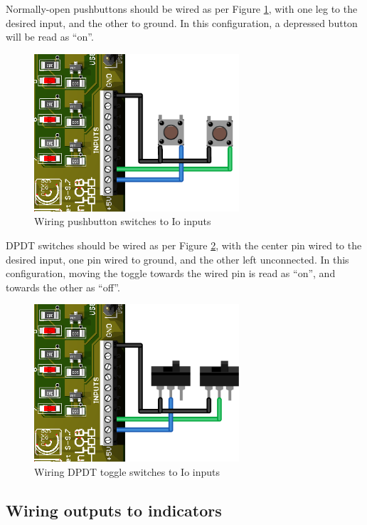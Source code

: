\documentclass[12pt]{book}
\begin{document}
Normally-open pushbuttons should be wired as per Figure \ref{pushbutton}, with one leg to the desired input, and the other to ground. In this configuration, a depressed button will be read as ``on''.

\begin{figure}[htbp]
\begin{center}
\includegraphics[width=3in]{images/Inputs-pushbutton.png}
\caption{Wiring pushbutton switches to Io inputs}
\label{pushbutton}
\end{center}
\end{figure}

DPDT switches should be wired as per Figure \ref{DPDT}, with the center pin wired to the desired input, one pin wired to ground, and the other left unconnected. In this configuration, moving the toggle towards the wired pin is read as ``on'', and towards the other as ``off''.

\begin{figure}[htbp]
\begin{center}
\includegraphics[width=3in]{images/Inputs-DPDT.png}
\caption{Wiring DPDT toggle switches to Io inputs}
\label{DPDT}
\end{center}
\end{figure}


\subsection{Wiring outputs to indicators}
\end{document}
